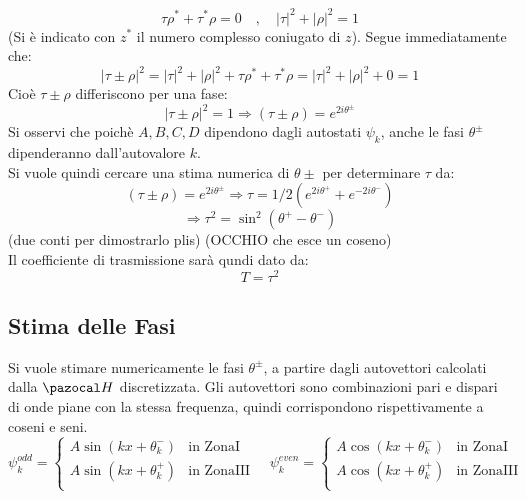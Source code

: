 $$ \tau\rho^* + \tau^*\rho = 0 \quad,\quad |\tau|^2 + |\rho|^2 = 1$$
(Si è indicato con $z^*$ il numero complesso coniugato di $z$). Segue immediatamente che:
$$ |\tau \pm \rho|^2 = |\tau|^2 + |\rho|^2 + \tau\rho^* + \tau^*\rho = |\tau|^2 + |\rho|^2 + 0 = 1$$
Cioè $\tau \pm \rho$ differiscono per una fase:
$$ |\tau \pm \rho|^2 = 1 \Rightarrow (\tau \pm \rho) = e^{2i\theta^\pm}$$
Si osservi che poichè $A,B,C,D$ dipendono dagli autostati $\psi_k$, anche le fasi $\theta^\pm$ dipenderanno dall'autovalore $k$.\\
Si vuole quindi cercare una stima numerica di $\theta\pm$ per determinare $\tau$ da:
    $$ (\tau \pm \rho) = e^{2i\theta^\pm} \Rightarrow \tau = 1/2(e^{2i\theta^+}+e^{-2i\theta^-})$$
    $$ \Rightarrow \tau^2 = \sin^2(\theta^+ - \theta^-)$$
(due conti per dimostrarlo plis) (OCCHIO che esce un coseno)
\\
Il coefficiente di trasmissione sarà qundi dato da:
    $$T = \tau^2$$

\subsection*{Stima delle Fasi}
Si vuole stimare numericamente le fasi $\theta^\pm$, a partire dagli autovettori
calcolati dalla $\Hh$ discretizzata. Gli autovettori sono combinazioni pari e dispari
di onde piane con la stessa frequenza, quindi corrispondono rispettivamente a coseni e seni.
    $$ \psi_k^{odd} = \begin{cases}
        A\sin(kx + \theta^-_k) & \mbox{in ZonaI} \\
        A\sin(kx + \theta^+_k) & \mbox{in ZonaIII} \\
    \end{cases}
    \quad
    \psi_k^{even} = \begin{cases}
        A\cos(kx + \theta^-_k) & \mbox{in ZonaI} \\
        A\cos(kx + \theta^+_k) & \mbox{in ZonaIII} \\
    \end{cases}
    $$

